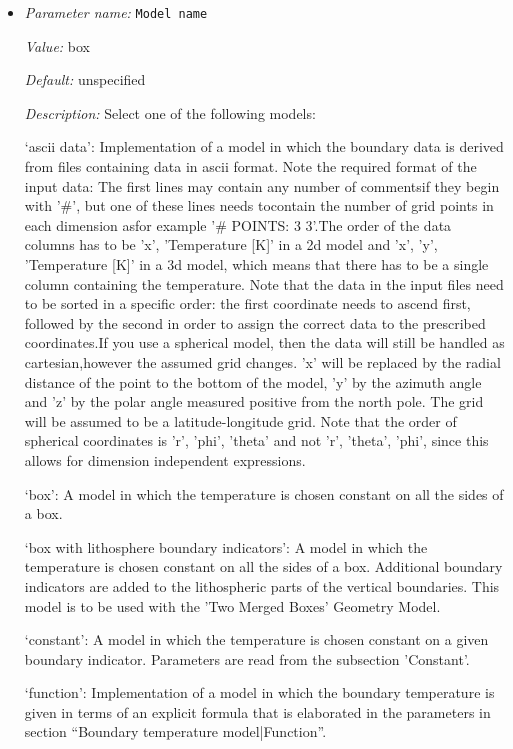 \begin{itemize}
\item {\it Parameter name:} {\tt Model name}
\label{parameters:Boundary temperature model/Model name}


{\it Value:} box


{\it Default:} unspecified


{\it Description:} Select one of the following models:

`ascii data': Implementation of a model in which the boundary data is derived from files containing data in ascii format. Note the required format of the input data: The first lines may contain any number of commentsif they begin with '#', but one of these lines needs tocontain the number of grid points in each dimension asfor example '# POINTS: 3 3'.The order of the data columns has to be 'x', 'Temperature [K]' in a 2d model and  'x', 'y', 'Temperature [K]' in a 3d model, which means that there has to be a single column containing the temperature. Note that the data in the input files need to be sorted in a specific order: the first coordinate needs to ascend first, followed by the second in order to assign the correct data to the prescribed coordinates.If you use a spherical model, then the data will still be handled as cartesian,however the assumed grid changes. 'x' will be replaced by the radial distance of the point to the bottom of the model, 'y' by the azimuth angle and 'z' by the polar angle measured positive from the north pole. The grid will be assumed to be a latitude-longitude grid. Note that the order of spherical coordinates is 'r', 'phi', 'theta' and not 'r', 'theta', 'phi', since this allows for dimension independent expressions. 

`box': A model in which the temperature is chosen constant on all the sides of a box.

`box with lithosphere boundary indicators': A model in which the temperature is chosen constant on all the sides of a box. Additional boundary indicators are added to the lithospheric parts of the vertical boundaries. This model is to be used with the 'Two Merged Boxes' Geometry Model.

`constant': A model in which the temperature is chosen constant on a given boundary indicator.  Parameters are read from the subsection 'Constant'.

`function': Implementation of a model in which the boundary temperature is given in terms of an explicit formula that is elaborated in the parameters in section ``Boundary temperature model|Function''. 


\end{itemize}
